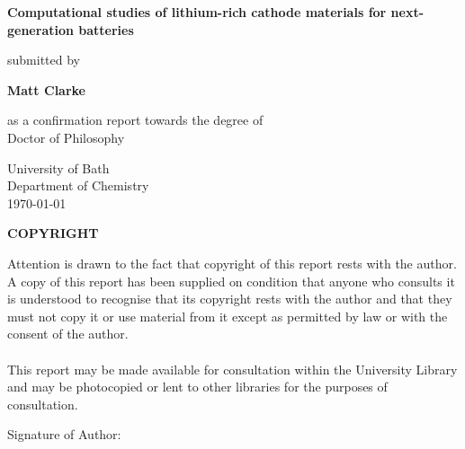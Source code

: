 \documentclass[12pt, oneside]{report}
\begin{document}
	
\setcounter{tocdepth}{1} 

\begin{titlepage}
\begin{center}
\vspace*{1cm}
 
\Large
\textbf{Computational studies of lithium-rich cathode materials for next-generation batteries}
       
\vspace{0.5cm}
\normalsize       
submitted by
       
      
\Large
\textbf{Matt Clarke}
 
\vspace{0.5cm}
\normalsize
as a confirmation report towards the degree of\\
Doctor of Philosophy
 
\vspace{0.5cm}
       
\LARGE
University of Bath\\
\normalsize
Department of Chemistry\\
       
\vspace{0.8cm}
\today
       
\vfill
\large
\textbf{COPYRIGHT}
\end{center}
Attention is drawn to the fact that copyright of this report rests with the author. A
copy of this report has been supplied on condition that anyone who consults it is
understood to recognise that its copyright rests with the author and that they must
not copy it or use material from it except as permitted by law or with the consent of
the author.
\\
\\
This report may be made available for consultation within the University Library and may be photocopied or lent to other libraries for the purposes of consultation.

\vspace{2cm}
\noindent Signature of Author: \dotfill
   
\end{titlepage}



\tableofcontents
\newpage


\newpage


\newpage
\end{document}
